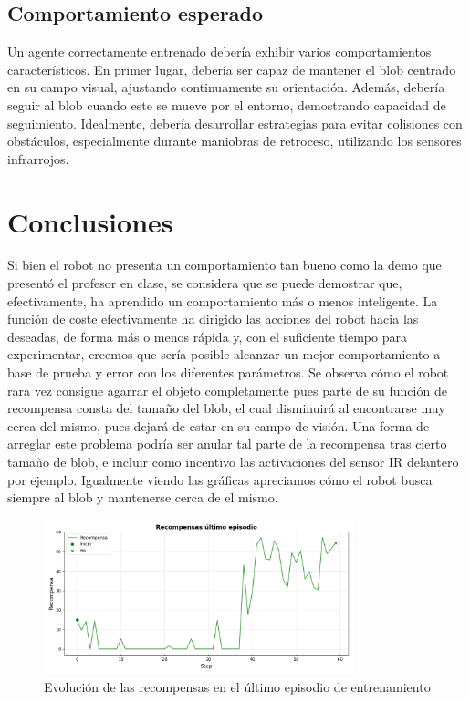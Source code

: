 \documentclass[12pt,a4paper]{article}
\begin{document}
\subsection{Comportamiento esperado}

Un agente correctamente entrenado debería exhibir varios comportamientos
característicos. En primer lugar, debería ser capaz de mantener el blob centrado
en su campo visual, ajustando continuamente su orientación. Además, debería
seguir al blob cuando este se mueve por el entorno, demostrando
capacidad de seguimiento. 
Idealmente, debería desarrollar estrategias para evitar colisiones con
obstáculos, especialmente durante maniobras de retroceso, utilizando
los sensores infrarrojos.

\section{Conclusiones}

Si bien el robot no presenta un comportamiento tan bueno como la demo que presentó el profesor en clase, se considera que se puede demostrar que, efectivamente, ha aprendido un comportamiento más o menos inteligente. La función de coste efectivamente ha dirigido las acciones del robot hacia las deseadas, de forma más o menos rápida y, con el suficiente tiempo para experimentar, creemos que sería posible alcanzar un mejor comportamiento a base de prueba y error con los diferentes parámetros.
Se observa cómo el robot rara vez consigue agarrar el objeto completamente pues parte de su función de recompensa consta del tamaño del blob, el cual disminuirá al encontrarse muy cerca del mismo, pues dejará de estar en su campo de visión. Una forma de arreglar este problema podría ser anular tal parte de la recompensa tras cierto tamaño de blob, e incluir como incentivo las activaciones del sensor IR delantero por ejemplo. Igualmente viendo las gráficas apreciamos cómo el robot busca siempre al blob y mantenerse cerca de el mismo.

\begin{figure}[h]
    \centering
    \includegraphics[width=0.8\textwidth]{Figure_1.png}
    \caption{Evolución de las recompensas en el último episodio de entrenamiento}
    \label{fig:etiqueta}
\end{figure}
\end{document}
